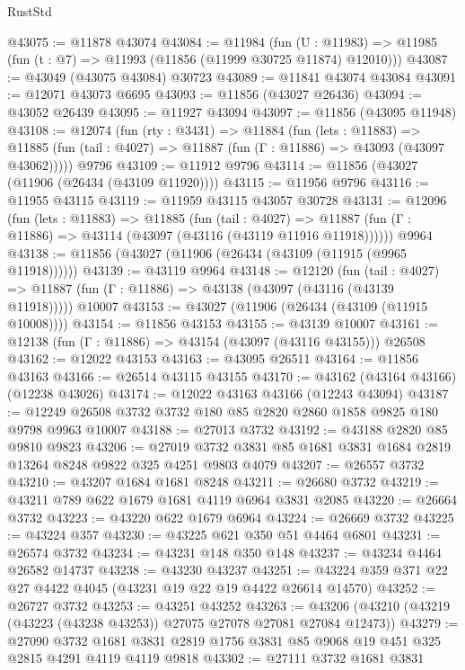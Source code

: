\begin{lexlean}{RustStd}
\begin{coremodule}
@43075 := @11878 @43074
@43084 := @11984
    (fun (U : @11983) => @11985 (fun (t : @7) => @11993 (@11856 (@11999 @30725 @11874) @12010)))
@43087 := @43049 (@43075 @43084) @30723
@43089 := @11841 @43074 @43084
@43091 := @12071 @43073 @6695
@43093 := @11856 (@43027 @26436)
@43094 := @43052 @26439
@43095 := @11927 @43094
@43097 := @11856 (@43095 @11948)
@43108 := @12074
    (fun (rty : @3431) =>
    @11884
      (fun (lets : @11883) =>
      @11885 (fun (tail : @4027) => @11887 (fun (Γ : @11886) => @43093 (@43097 @43062)))))
    @9796
@43109 := @11912 @9796
@43114 := @11856 (@43027 (@11906 (@26434 (@43109 @11920))))
@43115 := @11956 @9796
@43116 := @11955 @43115
@43119 := @11959 @43115 @43057 @30728
@43131 := @12096
    (fun (lets : @11883) =>
    @11885
      (fun (tail : @4027) =>
      @11887 (fun (Γ : @11886) => @43114 (@43097 (@43116 (@43119 @11916 @11918))))))
    @9964
@43138 := @11856 (@43027 (@11906 (@26434 (@43109 (@11915 (@9965 @11918))))))
@43139 := @43119 @9964
@43148 := @12120
    (fun (tail : @4027) => @11887 (fun (Γ : @11886) => @43138 (@43097 (@43116 (@43139 @11918)))))
    @10007
@43153 := @43027 (@11906 (@26434 (@43109 (@11915 @10008))))
@43154 := @11856 @43153
@43155 := @43139 @10007
@43161 := @12138 (fun (Γ : @11886) => @43154 (@43097 (@43116 @43155))) @26508
@43162 := @12022 @43153
@43163 := @43095 @26511
@43164 := @11856 @43163
@43166 := @26514 @43115 @43155
@43170 := @43162 (@43164 @43166) (@12238 @43026)
@43174 := @12022 @43163 @43166 (@12243 @43094)
@43187 := @12249 @26508 @3732 @3732 @180 @85 @2820 @2860 @1858 @9825 @180 @9798 @9963 @10007
@43188 := @27013 @3732
@43192 := @43188 @2820 @85 @9810 @9823
@43206 := @27019 @3732 @3831 @85 @1681 @3831 @1684 @2819 @13264 @8248 @9822 @325 @4251 @9803 @4079
@43207 := @26557 @3732
@43210 := @43207 @1684 @1681 @8248
@43211 := @26680 @3732
@43219 := @43211 @789 @622 @1679 @1681 @4119 @6964 @3831 @2085
@43220 := @26664 @3732
@43223 := @43220 @622 @1679 @6964
@43224 := @26669 @3732
@43225 := @43224 @357
@43230 := @43225 @621 @350 @51 @4464 @6801
@43231 := @26574 @3732
@43234 := @43231 @148 @350 @148
@43237 := @43234 @4464 @26582 @14737
@43238 := @43230 @43237
@43251 := @43224 @359 @371 @22 @27 @4422 @4045 (@43231 @19 @22 @19 @4422 @26614 @14570)
@43252 := @26727 @3732
@43253 := @43251 @43252
@43263 := @43206 (@43210 (@43219 (@43223 (@43238 @43253)) @27075 @27078 @27081 @27084 @12473))
@43279 := @27090
    @3732
    @1681
    @3831
    @2819
    @1756
    @3831
    @85
    @9068
    @19
    @451
    @325
    @2815
    @4291
    @4119
    @4119
    @9818
@43302 := @27111
    @3732
    @1681
    @3831

\end{coremodule}
\end{lexlean}
